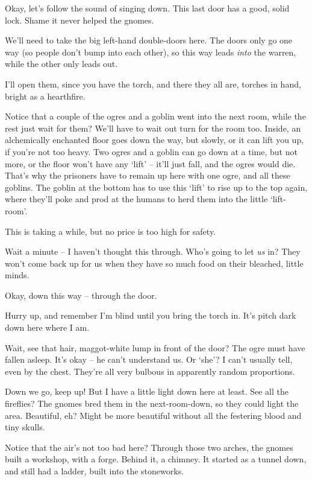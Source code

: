 \begin{multicols}{2}
\begin{exampletext}
Okay, let's follow the sound of singing down.
This last door has a good, solid lock.
Shame it never helped the gnomes.

We'll need to take the big left-hand double-doors here.
The doors only go one way (so people don't bump into each other), so this way leads \emph{into} the warren, while the other only leads out.

I'll open them, since you have the torch, and there they all are, torches in hand, bright as a hearthfire.

Notice that a couple of the ogres and a goblin went into the next room, while the rest just wait for them?
We'll have to wait out turn for the room too.
Inside, an alchemically enchanted floor goes down the way, but slowly, or it can lift you up, if you're not too heavy.
Two ogres and a goblin can go down at a time, but not more, or the floor won't have any `lift' -- it'll just fall, and the ogres would die.
That's why the prisoners have to remain up here with one ogre, and all these goblins.
The goblin at the bottom has to use this `lift' to rise up to the top again, where they'll poke and prod at the humans to herd them into the little `lift-room'.

This is taking a while, but no price is too high for safety.

Wait a minute -- I haven't thought this through.
Who's going to let \emph{us} in?
They won't come back up for us when they have so much food on their bleached, little minds.

Okay, down this way -- through the door.

Hurry up, and remember I'm blind until you bring the torch in.
It's pitch dark down here where I am.

Wait, see that hair, maggot-white lump in front of the door?
The ogre must have fallen asleep.
It's okay -- he can't understand us.
Or `she'?
I can't usually tell, even by the chest.
They're all very bulbous in apparently random proportions.

Down we go, keep up!
But I have a little light down here at least.
See all the fireflies?
The gnomes bred them in the next-room-down, so they could light the area.
Beautiful, eh?
Might be more beautiful without all the festering blood and tiny skulls.

Notice that the air's not too bad here?
Through those two arches, the gnomes built a workshop, with a forge.
Behind it, a chimney.
It started as a tunnel down, and still had a ladder, built into the stoneworks.


\end{exampletext}
\end{multicols}
